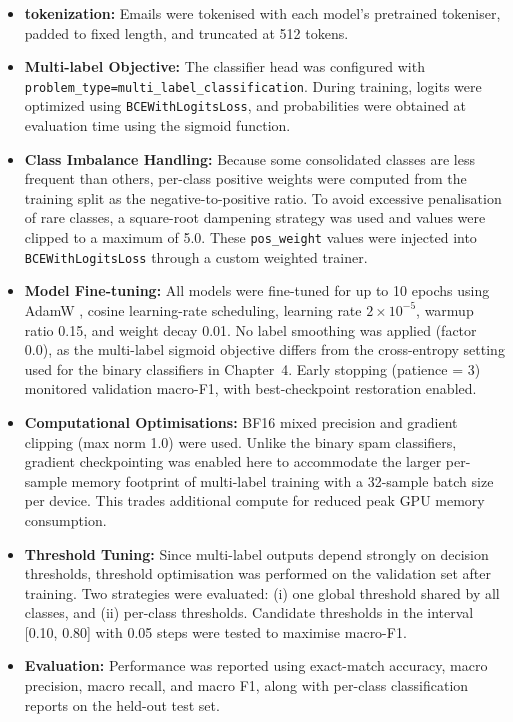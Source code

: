 \begin{itemize}
	\item \textbf{tokenization:} Emails were tokenised with each model's pretrained tokeniser, padded to fixed length, and truncated at 512 tokens.

	\item \textbf{Multi-label Objective:} The classifier head was configured with \texttt{problem\_type=multi\_label\_classification}. During training, logits were optimized using \texttt{BCEWithLogitsLoss}, and probabilities were obtained at evaluation time using the sigmoid function.

	\item \textbf{Class Imbalance Handling:} Because some consolidated classes are less frequent than others, per-class positive weights were computed from the training split as the negative-to-positive ratio. To avoid excessive penalisation of rare classes, a square-root dampening strategy was used and values were clipped to a maximum of 5.0. These \texttt{pos\_weight} values were injected into \texttt{BCEWithLogitsLoss} through a custom weighted trainer.

	\item \textbf{Model Fine-tuning:} All models were fine-tuned for up to 10 epochs using \acs{AdamW} \cite{loshchilov2019decoupled}, cosine learning-rate scheduling, learning rate $2 \times 10^{-5}$, warmup ratio 0.15, and weight decay 0.01. No label smoothing was applied (factor 0.0), as the multi-label sigmoid objective differs from the cross-entropy setting used for the binary classifiers in Chapter~4. Early stopping (patience = 3) monitored validation macro-F1, with best-checkpoint restoration enabled.

	\item \textbf{Computational Optimisations:} \ac{BF16} mixed precision \cite{micikevicius2018mixed} and gradient clipping (max norm 1.0) were used. Unlike the binary spam classifiers, gradient checkpointing was enabled here to accommodate the larger per-sample memory footprint of multi-label training with a 32-sample batch size per device. This trades additional compute for reduced peak \ac{GPU} memory consumption.

	\item \textbf{Threshold Tuning:} Since multi-label outputs depend strongly on decision thresholds, threshold optimisation was performed on the validation set after training. Two strategies were evaluated: (i) one global threshold shared by all classes, and (ii) per-class thresholds. Candidate thresholds in the interval [0.10, 0.80] with 0.05 steps were tested to maximise macro-F1.

	\item \textbf{Evaluation:} Performance was reported using exact-match accuracy, macro precision, macro recall, and macro F1, along with per-class classification reports on the held-out test set.
\end{itemize}

